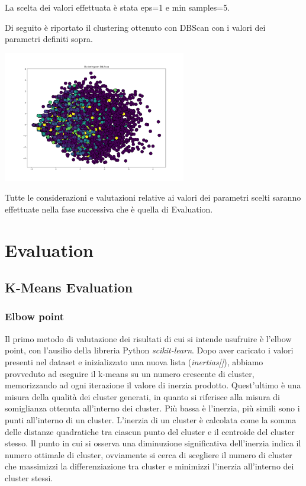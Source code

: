 \documentclass[a4paper, 10pt]{report}
\begin{document}
                La scelta dei valori effettuata è stata eps=1 e min samples=5.

                Di seguito è riportato il clustering ottenuto con DBScan con i valori dei parametri definiti sopra.

                \begin{center}
                    \includegraphics[width=8cm]{modelling/DBScan.png}\\
                \end{center}

                Tutte le considerazioni e valutazioni relative ai valori dei parametri scelti saranno effettuate nella fase successiva
                che è quella di Evaluation.


    \chapter{Evaluation}\label{ch:evaluation}

        \section{K-Means Evaluation}\label{sec:k-means-evaluation}
            \subsection{Elbow point}
                Il primo metodo di valutazione dei risultati di cui si intende usufruire è l'elbow point, con l'ausilio della
                libreria Python \textit{scikit-learn}. Dopo aver caricato i valori presenti nel dataset e inizializzato una nuova
                lista (\textit{inertias[]}), abbiamo provveduto ad eseguire il k-means su un numero crescente di cluster, memorizzando
                ad ogni iterazione il valore di inerzia prodotto.
                Quest'ultimo è una misura della qualità dei cluster generati, in quanto si riferisce alla misura di somiglianza ottenuta
                all'interno dei cluster.
                Più bassa è l'inerzia, più simili sono i punti all'interno di un cluster.
                L'inerzia di un cluster è calcolata come la somma delle distanze quadratiche tra ciascun punto del cluster e il
                centroide del cluster stesso.
                Il punto in cui si osserva una diminuzione significativa dell'inerzia indica il numero ottimale di cluster, ovviamente
                si cerca di scegliere il numero di cluster che massimizzi la differenziazione tra cluster e
                minimizzi l'inerzia all'interno dei cluster stessi.
\end{document}
